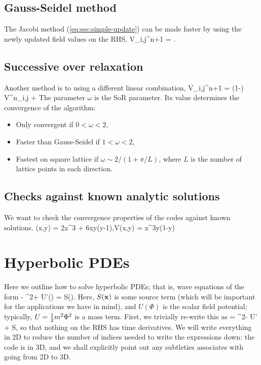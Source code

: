 \documentclass[amsmath,amssymb,12pt, eqsecnum]{revtex4}
\begin{document}
\subsection{Gauss-Seidel method}
The Jacobi method   (\ref{eq:sec:simple-update}) can be made faster by using the newly updated field values on the RHS,
\bea
V_{i,j}^{n+1} = .
\eea
\subsection{Successive over relaxation}
Another method is to using a different linear combination,
\bea
V_{i,j}^{n+1} = (1-\omega) V^n_{i,j} + 
\eea
The parameter $\omega$ is the SoR parameter. Its value determines the convergence of the algorithm:
\begin{itemize}
\item Only convergent if $0<\omega <2$,
\item Faster than Gauss-Seidel if $1 <\omega <2$,
\item Fastest on square lattice if $\omega \sim 2/(1+\pi/L)$, where $L$ is the number of lattice points in each direction.
\end{itemize}
\subsection{Checks against known analytic solutions}
We want to check the convergence properties of the codes against known solutions.
\bea
\rho(x,y) = 2x^3 + 6xy(y-1),\qquad V(x,y) = x^3y(1-y)
\eea
\section{Hyperbolic PDEs}
Here we outline how to solve hyperbolic PDEs; that is, wave equations of the form
\bea
\ddot{\Phi} - \nabla^2\Phi + U'(\Phi) = S().
\eea
Here, $S({\bf{x}})$ is some source term (which will be important for the applications we have in mind), and  $U(\Phi)$ is the scalar field potential; typically, $U = \frac{1}{2} m^2\Phi^2$ is a mass term. First, we trivially re-write this as
\bea
\ddot{\Phi} = \nabla^2\Phi - U' + S,
\eea
so that nothing on the RHS has time derivatives. We will write everything in 2D to reduce the number of indices needed to write the expressions down: the code is in 3D, and we shall explicitly point out any subtleties associates with going from 2D to 3D. 
\end{document}
